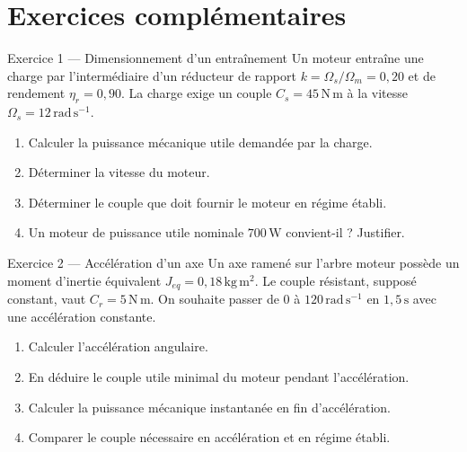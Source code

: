 
\section{Exercices complémentaires}\label{sec:em-exercices}

\begin{TLExercise}{Exercice 1 — Dimensionnement d'un entraînement}
Un moteur entraîne une charge par l'intermédiaire d'un réducteur de rapport
$k=\Omega_s/\Omega_m=0{,}20$ et de rendement $\eta_r=0{,}90$. La charge exige
un couple $C_s=45\,\mathrm{N\,m}$ à la vitesse $\Omega_s=12\,\mathrm{rad\,s^{-1}}$.
\begin{enumerate}
  \item Calculer la puissance mécanique utile demandée par la charge.
  \item Déterminer la vitesse du moteur.
  \item Déterminer le couple que doit fournir le moteur en régime établi.
  \item Un moteur de puissance utile nominale $700\,\mathrm W$ convient-il ? Justifier.
\end{enumerate}
\end{TLExercise}

\begin{TLExercise}{Exercice 2 — Accélération d'un axe}
Un axe ramené sur l'arbre moteur possède un moment d'inertie équivalent
$J_{eq}=0{,}18\,\mathrm{kg\,m^2}$. Le couple résistant, supposé constant, vaut
$C_r=5\,\mathrm{N\,m}$. On souhaite passer de $0$ à
$120\,\mathrm{rad\,s^{-1}}$ en $1{,}5\,\mathrm s$ avec une accélération constante.
\begin{enumerate}
  \item Calculer l'accélération angulaire.
  \item En déduire le couple utile minimal du moteur pendant l'accélération.
  \item Calculer la puissance mécanique instantanée en fin d'accélération.
  \item Comparer le couple nécessaire en accélération et en régime établi.
\end{enumerate}
\end{TLExercise}

